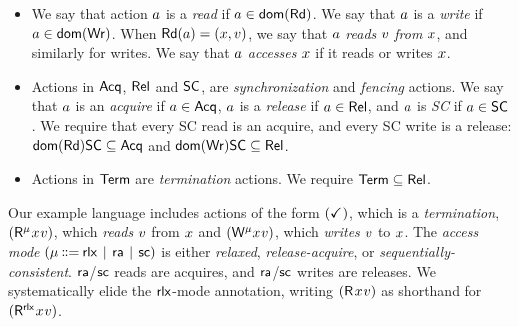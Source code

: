 %
%
  \begin{itemize}    
  \item We say that action $a$ is a \emph{read} if
    $a\in\mathsf{dom}(\mathsf{Rd})$. We say that $a$ is a \emph{write} if
    $a\in\mathsf{dom}(\mathsf{Wr})$.  When $\mathsf{Rd}(a) = (x,v)$,
    we say that $a$ \emph{reads} $v$ \emph{from} $x$, and
    similarly for writes.  We say that $a$ \emph{accesses} $x$ if it
    reads or writes $x$.

  \item Actions in $\mathsf{Acq}$, $\mathsf{Rel}$ and $\mathsf{SC}$, are \emph{synchronization} and
    \emph{fencing} actions.  We say that $a$ is an \emph{acquire} if
    $a\in\mathsf{Acq}$, $a$ is a \emph{release} if $a\in\mathsf{Rel}$, and
    $a$ is \emph{SC} if $a\in\mathsf{SC}$.  We require that every SC read is
    an acquire, and every SC write is a release:
    $\mathsf{dom}(\mathsf{Rd})\mathsf{SC}\subseteq\mathsf{Acq}$ and 
    $\mathsf{dom}(\mathsf{Wr})\mathsf{SC}\subseteq\mathsf{Rel}$.

    
  \item Actions in $\mathsf{Term}$ are \emph{termination} actions. We require $\mathsf{Term}\subseteq\mathsf{Rel}$.
  \end{itemize}

  Our example language includes actions of the form $(\checkmark_{})$, which is a
  \emph{termination}, $(\DR[\amode][\aThrd]{\aLoc}{\aVal})$, which
  \emph{reads} $v$ from $x$ and
  $(\DW[\amode][\aThrd]{\aLoc}{\aVal})$, which \emph{writes} $v$ to
  $x$.
The \emph{access mode} $(\amode \!\!\BNFDEF\!\! \modeRLX \!\BNFSEP\! \modeRA \!\BNFSEP\! \modeSC)$ is
either \emph{relaxed}, \emph{release-acquire}, or
\emph{sequentially-consistent}.
${\mathsf{ra}}$/${\mathsf{sc}}$ reads are acquires, and ${\mathsf{ra}}$/${\mathsf{sc}}$ writes are releases.
We systematically elide the ${\mathsf{rlx}}$-mode annotation, writing $(\DR{\aLoc}{\aVal})$
as shorthand for $(\DR[\modeRLX]{\aLoc}{\aVal})$.

